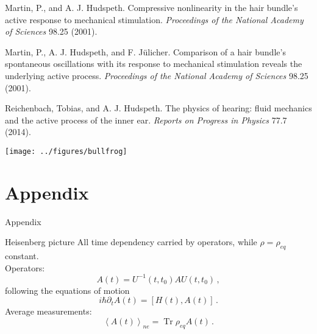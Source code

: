 \documentclass[xcolor=x11names,compress]{beamer}
\renewcommand{\(}{\begin{columns}}
\renewcommand{\)}{\end{columns}}
\newcommand{\<}[1]{\begin{column}{#1}}
\renewcommand{\>}{\end{column}}
\DeclareMathOperator{\Tr}{Tr} %
\begin{document}
\begin{frame}[t]
    Martin, P., and A. J. Hudspeth. 
    Compressive nonlinearity in the hair bundle's active response to mechanical stimulation.
    \textit{Proceedings of the National Academy of Sciences} 98.25 (2001).
    \vspace{0.1cm}

    Martin, P., A. J. Hudspeth, and F. Jülicher. 
    Comparison of a hair bundle's spontaneous oscillations with its response to 
    mechanical stimulation reveals the underlying active process. 
    \textit{Proceedings of the National Academy of Sciences} 98.25 (2001).
    \vspace{0.1cm}

    Reichenbach, Tobias, and A. J. Hudspeth. 
    The physics of hearing: fluid mechanics and the active process of the inner ear.
    \textit{Reports on Progress in Physics} 77.7 (2014).
    \vspace{0.1cm}


\end{frame}


\begin{frame}[t]{}
    \texttt{[image: ../figures/bullfrog]}
\end{frame}




\section*{Appendix}
\label{sec:appendix}


\begin{frame}{}
    \huge Appendix
\end{frame}

\begin{frame}[t]{Heisenberg picture}
All time dependency carried by operators, while
$\rho = \rho_{eq}$ constant. \\
Operators:
\begin{equation*}
    A(t) = U^{-1}(t, t_0) A U(t, t_0)\,,
\end{equation*}
following the equations of motion
\begin{equation*}
    i \hbar \partial_t A(t) = [H(t), A(t)]\,.
\end{equation*}
Average measurements:
\begin{equation*}
    \left \langle A(t) \right \rangle_{ne} = \Tr  \rho_{eq} A(t)\,.
\end{equation*}
\end{frame}
    
\end{document}
